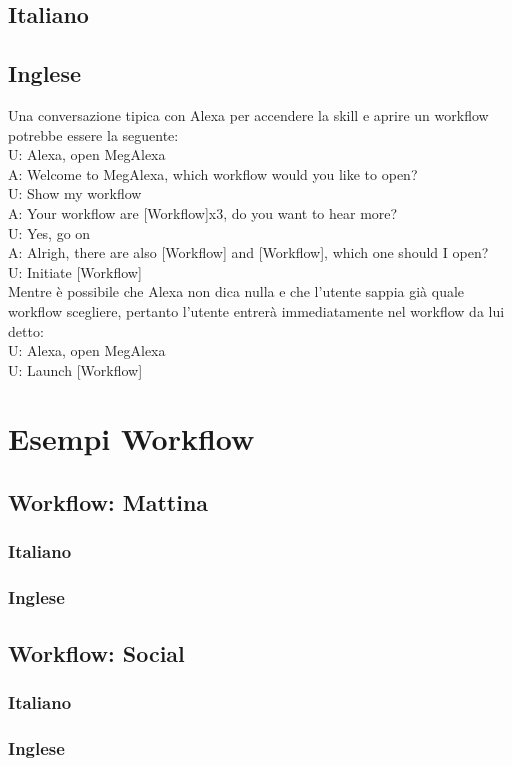 \subsection{Italiano}





\subsection{Inglese}
Una conversazione tipica con Alexa per accendere la skill e aprire un workflow potrebbe essere la seguente:\\

U: Alexa, open MegAlexa \\
A: Welcome to MegAlexa, which workflow would you like to open?\\
U: Show my workflow\\
A: Your workflow are [Workflow]x3, do you want to hear more?\\
U: Yes, go on\\
A: Alrigh, there are also [Workflow] and [Workflow], which one should I open?\\
U: Initiate [Workflow] \\

Mentre è possibile che Alexa non dica nulla e che l'utente sappia già quale workflow scegliere, pertanto l'utente entrerà immediatamente nel workflow da lui detto: \\
U: Alexa, open MegAlexa\\
U: Launch [Workflow]\\

\section{Esempi Workflow}
\subsection{Workflow: Mattina}
\subsubsection{Italiano}
\subsubsection{Inglese}


\subsection{Workflow: Social}
\subsubsection{Italiano}
\subsubsection{Inglese}